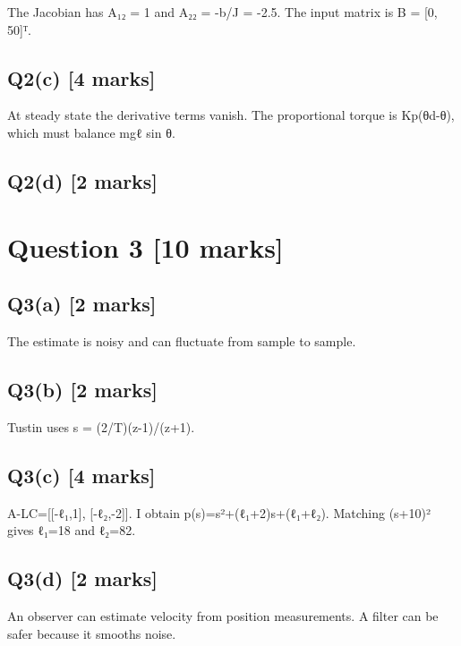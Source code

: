 \documentclass[11pt,a4paper]{article}
\begin{document}
The Jacobian has A₁₂ = 1 and A₂₂ = -b/J = -2.5.
The input matrix is B = [0, 50]ᵀ.

\subsection*{Q2(c) \hfill [4 marks]}

At steady state the derivative terms vanish.
The proportional torque is Kp(θd-θ), which must balance mgℓ sin θ.

\subsection*{Q2(d) \hfill [2 marks]}

\vspace{2mm}

\section*{Question 3 \hfill [10 marks]}
\subsection*{Q3(a) \hfill [2 marks]}

The estimate is noisy and can fluctuate from sample to sample.

\subsection*{Q3(b) \hfill [2 marks]}

Tustin uses s = (2/T)(z-1)/(z+1).

\subsection*{Q3(c) \hfill [4 marks]}

A-LC=[[-ℓ₁,1], [-ℓ₂,-2]].
I obtain p(s)=s²+(ℓ₁+2)s+(ℓ₁+ℓ₂).
Matching (s+10)² gives ℓ₁=18 and ℓ₂=82.

\subsection*{Q3(d) \hfill [2 marks]}

An observer can estimate velocity from position measurements.
A filter can be safer because it smooths noise.
\end{document}
